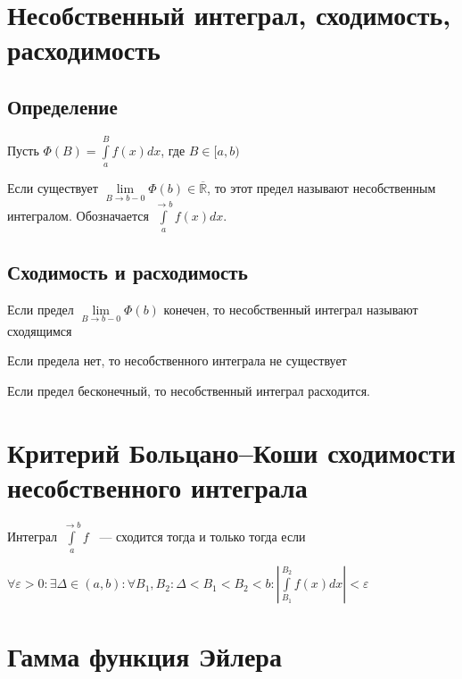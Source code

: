 \documentclass{article}
\begin{document}
    \newpage
    
    \section{Несобственный интеграл, сходимость, расходимость}
    
        \subsection{Определение}
        
            Пусть $\Phi(B) = \int\limits^B_a f(x)dx$, где $B \in [a, b)$
            
            Если существует $\lim\limits_{B \rightarrow b - 0} \Phi(b) \in \overline{\mathbb{R}}$, то этот предел называют несобственным интегралом. Обозначается $\int\limits^{\rightarrow b}_a f(x)dx$.
            
        \subsection{Сходимость и расходимость}
        
            Если предел $\lim\limits_{B \rightarrow b - 0} \Phi(b)$ конечен, то несобственный интеграл называют сходящимся
            
            Если предела нет, то несобственного интеграла не существует
            
            Если предел бесконечный, то несобственный интеграл расходится.
            
    \newpage
    
    \section{Критерий Больцано--Коши сходимости несобственного интеграла}
    
        Интеграл $\int\limits^{\rightarrow b}_a f$ ~--- сходится тогда и только тогда если
        
        $\forall \varepsilon > 0 : \exists \Delta \in (a, b) : \forall B_1, B_2 : \Delta < B_1 < B_2 < b : \left| \int\limits^{B_2}_{B_1} f(x)dx \right| < \varepsilon$
        
    \newpage
    
    \section{Гамма функция Эйлера}
        
\end{document}
